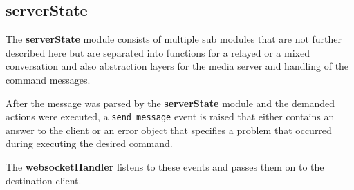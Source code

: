 \documentclass[../../../thesis.tex]{subfiles}
\begin{document}
\subsection{serverState}
The \textbf{serverState} module consists of multiple sub modules that are not further described here but are separated into functions for a relayed or a mixed conversation and also abstraction layers for the media server and handling of the command messages.\par
After the message was parsed by the \textbf{serverState} module and the demanded actions were executed, a \texttt{send\_message} event is raised that either contains an answer to the client or an error object that specifies a problem that occurred during executing the desired command.\par
The \textbf{websocketHandler} listens to these events and passes them on to the destination client.

\clearpage
\end{document}
